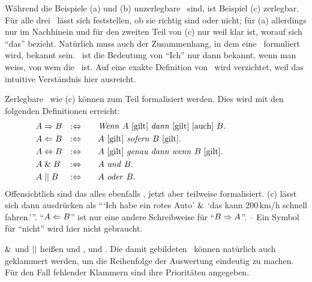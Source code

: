 Während die Beispiele (a) und (b) unzerlegbare \Aussagen\ sind, ist Beispiel (c) zerlegbar.
Für alle drei \Aussagen\ lässt sich feststellen, ob sie richtig sind oder nicht;
für (a) allerdings nur im Nachhinein und für den zweiten Teil von (c) nur weil klar ist, worauf sich \enquote{das} bezieht.
Natürlich muss auch der Zusammenhang, in dem eine \Aussage\ formuliert wird, bekannt sein.
\textZB\ ist die Bedeutung von \enquote{Ich} nur dann bekannt, wenn man weiss, von wem die \Aussage\ ist.
Auf eine exakte Definition von \Aussage\ wird verzichtet, weil das intuitive Verständnis hier ausreicht.

Zerlegbare \Aussagen\ wie (c) können zum Teil formalisiert werden.
Dies wird mit den folgenden Definitionen erreicht:
%
\begin{align}
	& A \Rightarrow   B & :\Leftrightarrow & \qquad
	\text{\emph{Wenn} $A$ [gilt] \emph{dann} [gilt] [auch] $B$.}
	\\
	& A \Leftarrow   B & :\Leftrightarrow & \qquad
	\text{$A$ [gilt] \emph{sofern}          $B$ [gilt].}
	\\
	& A \Leftrightarrow B & :\Leftrightarrow & \qquad
	\text{$A$ [gilt] \emph{genau dann wenn} $B$ [gilt].}
	\\
	& A \;\&\;   B & :\Leftrightarrow & \qquad
	\text{$A$ \emph{und}  $B$.}
	\\
	& A \;||\;    B & :\Leftrightarrow & \qquad
	\text{$A$ \emph{oder} $B$.}
	&&&&&&&&&&
\end{align}
%
Offensichtlich sind das alles ebenfalls \Aussagen, jetzt aber teilweise formalisiert.
(c) lässt sich dann ausdrücken als \enquote{\enquote{Ich habe ein rotes Auto} $\&$ \enquote{das kann 200\,km/h schnell fahren.}}.
\enquote{$A \Leftarrow B$} ist nur eine andere Schreibweise für \enquote{$B \Rightarrow A$}.
-- Ein Symbol für \enquote{nicht} wird hier nicht gebraucht.

$\&$\hidden{\glsIdxPl{\metaand}} und $||$\hidden{\glsIdxPl{\metaor}} heißen  und ,  und  .
Die damit gebildeten \Aussagen\ können natürlich auch geklammert werden, um die Reihenfolge der Auswertung eindeutig zu machen.
Für den Fall fehlender Klammern sind ihre Prioritäten  angegeben.

